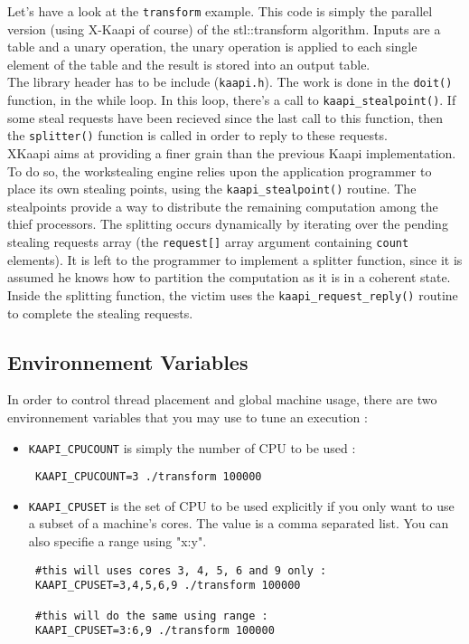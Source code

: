 \documentclass{article}
\newcommand{\kaapi}{\textsc{X}-Kaapi\xspace}
\begin{document}
Let's have a look at the \verb+transform+ example. This code is simply the parallel version (using \kaapi  of course) of the stl::transform
algorithm. Inputs are a table and a unary operation, the unary operation is applied to each single element of the table and the result is stored into an output table.
\\

The library header has to be include (\verb+kaapi.h+). The work is done in the \verb+doit()+ function, in the while loop. In this loop, there's a call to \verb+kaapi_stealpoint()+. If some steal requests have been recieved since the last call to this function, then the \verb+splitter()+ function is called in order to reply to these requests.
\\

XKaapi aims at providing a finer grain than the previous Kaapi implementation. To do so, the workstealing engine relies upon the application programmer to place its own stealing points, using the \verb+kaapi_stealpoint()+ routine. The stealpoints provide a way to distribute the remaining computation among the thief processors. The splitting occurs dynamically by iterating over the pending stealing requests array (the \verb+request[]+ array argument containing \verb+count+ elements). It is left to the programmer to implement a splitter function, since it is assumed he knows how to partition the computation as it is in a coherent state. Inside the splitting function, the victim uses the \verb+kaapi_request_reply()+ routine to complete the stealing requests.

\subsection{Environnement Variables}

In order to control thread placement and global machine usage, there are two environnement variables that you may use to tune an execution :

\begin{itemize}
\item \verb+KAAPI_CPUCOUNT+ is simply the number of CPU to be used :

\begin{verbatim}
 KAAPI_CPUCOUNT=3 ./transform 100000
\end{verbatim}

\item \verb+KAAPI_CPUSET+ is the set of CPU to be used explicitly if you only want to use a subset of a machine's cores. The value is a comma separated list. You can also specifie a range using "x:y".

\begin{verbatim}
 #this will uses cores 3, 4, 5, 6 and 9 only :
 KAAPI_CPUSET=3,4,5,6,9 ./transform 100000
 
 #this will do the same using range :
 KAAPI_CPUSET=3:6,9 ./transform 100000
\end{verbatim}

\end{itemize}
\end{document}
